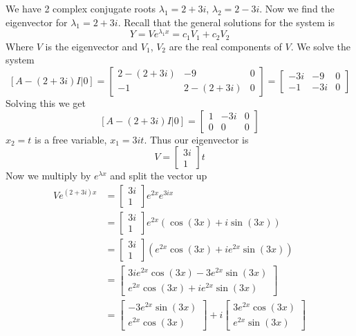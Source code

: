 \documentclass[openany]{report}
\begin{document}
We have 2 complex conjugate roots $\lambda_1 = 2 + 3i$, $\lambda_2 = 2-3i$. Now we find the eigenvector for $\lambda_1 = 2 + 3i$. Recall that the general solutions for the system is 
\[Y = Ve^{\lambda_1 x} = c_1V_1 + c_2V_2\]
Where $V$ is the eigenvector and $V_1$, $V_2$ are the real components of $V$. We solve the system
\[[A - (2+3i)I|0] = \begin{bmatrix}
    2 - (2 + 3i) & -9 & 0\\
    -1 & 2 - (2 + 3i) & 0
\end{bmatrix} = \begin{bmatrix}
    -3i & -9 & 0\\
    -1 & -3i & 0
\end{bmatrix}\]
Solving this we get 
\[[A - (2+3i)I|0] = \begin{bmatrix}
    1 & -3i & 0\\
    0 & 0 & 0
\end{bmatrix}\]
$x_2 = t$ is a free variable, $x_1 = 3it$. Thus our eigenvector is
\[V = \begin{bmatrix}
    3i\\
    1
\end{bmatrix}t\]
Now we multiply by $e^{\lambda x}$ and split the vector up 
\begin{align*}
    Ve^{(2+3i)x} &= \begin{bmatrix}
        3i\\
        1
    \end{bmatrix}e^{2x}e^{3ix}\\
    &= \begin{bmatrix}
        3i\\
        1
    \end{bmatrix}e^{2x}(\cos(3x) + i\sin(3x))\\
    &= \begin{bmatrix}
        3i\\
        1
    \end{bmatrix}(e^{2x}\cos(3x) + ie^{2x}\sin(3x))\\
    &= \begin{bmatrix}
        3ie^{2x}\cos(3x) - 3e^{2x}\sin(3x)\\
        e^{2x}\cos(3x) + ie^{2x}\sin(3x)
    \end{bmatrix}\\
    &= \begin{bmatrix}
        -3e^{2x}\sin(3x)\\
        e^{2x}\cos(3x)
    \end{bmatrix} + i\begin{bmatrix}
        3e^{2x}\cos(3x)\\
        e^{2x}\sin(3x)
    \end{bmatrix}
\end{align*}
\end{document}
